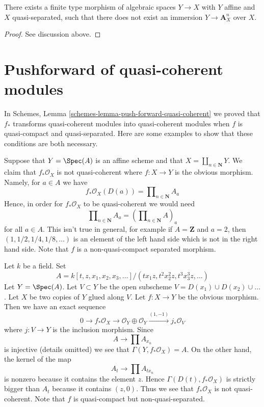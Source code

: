 \begin{lemma}
\label{lemma-cannot-embed-into-affine}
There exists a finite type morphism of algebraic spaces $Y \to X$
with $Y$ affine and $X$ quasi-separated, such that there does not exist
an immersion $Y \to \mathbf{A}^n_X$ over $X$.
\end{lemma}

\begin{proof}
See discussion above.
\end{proof}










\section{Pushforward of quasi-coherent modules}
\label{section-push-quasi-coherent}

\noindent
In Schemes, Lemma \ref{schemes-lemma-push-forward-quasi-coherent}
we proved that $f_*$ transforms quasi-coherent modules into quasi-coherent
modules when $f$ is quasi-compact and quasi-separated. Here are some
examples to show that these conditions are both necessary.

\medskip\noindent
Suppose that $Y = \Spec(A)$ is an affine scheme and that
$X = \coprod_{n \in \mathbf{N}} Y$. We claim that $f_*\mathcal{O}_X$
is not quasi-coherent where $f : X \to Y$ is the obvious morphism.
Namely, for $a \in A$ we have
$$
f_*\mathcal{O}_X(D(a)) = \prod\nolimits_{n \in \mathbf{N}} A_a
$$
Hence, in order for $f_*\mathcal{O}_X$ to be quasi-coherent we would need
$$
\prod\nolimits_{n \in \mathbf{N}} A_a
=
\left(\prod\nolimits_{n \in \mathbf{N}} A\right)_a
$$
for all $a \in A$. This isn't true in general, for example if
$A = \mathbf{Z}$ and $a = 2$, then $(1, 1/2, 1/4, 1/8, \ldots)$
is an element of the left hand side which is not in the right hand side.
Note that $f$ is a non-quasi-compact separated morphism.

\medskip\noindent
Let $k$ be a field. Set
$$
A = k[t, z, x_1, x_2, x_3, \ldots]/(tx_1z, t^2x_2^2z, t^3x_3^3z, \ldots)
$$
Let $Y = \Spec(A)$. Let $V \subset Y$ be the open subscheme
$V = D(x_1) \cup D(x_2) \cup \ldots$. Let $X$ be two copies of $Y$
glued along $V$. Let $f : X \to Y$ be the obvious morphism. Then we
have an exact sequence
$$
0 \to f_*\mathcal{O}_X \to
\mathcal{O}_Y \oplus \mathcal{O}_Y \xrightarrow{(1, -1)} j_*\mathcal{O}_V
$$
where $j : V \to Y$ is the inclusion morphism. Since
$$
A \longrightarrow \prod A_{x_n}
$$
is injective (details omitted) we see that $\Gamma(Y, f_*\mathcal{O}_X) = A$.
On the other hand, the kernel of the map
$$
A_t \longrightarrow \prod A_{tx_n}
$$
is nonzero because it contains the element $z$. Hence
$\Gamma(D(t), f_*\mathcal{O}_X)$ is strictly bigger than
$A_t$ because it contains $(z, 0)$. Thus we see that $f_*\mathcal{O}_X$
is not quasi-coherent. Note that $f$ is quasi-compact but
non-quasi-separated.

